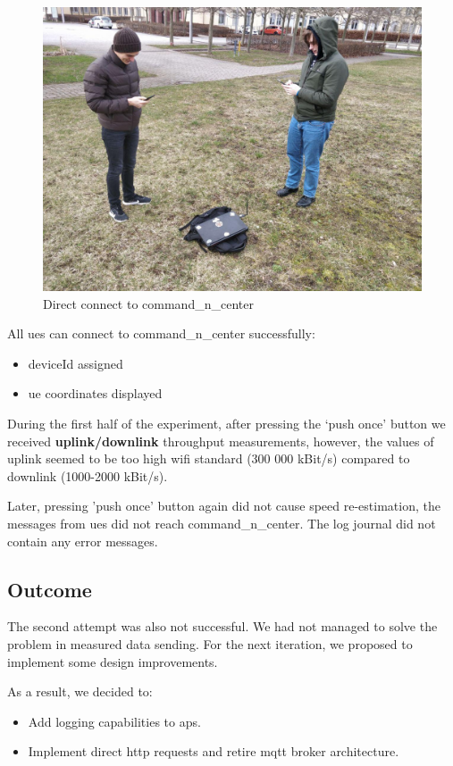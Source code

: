\begin{figure}[H]
	\centering
	\includegraphics[width=0.7\linewidth,keepaspectratio]{images/experiment_2_overview.jpg}
	\caption{Direct connect to \gls{command_n_center}}
	\label{fig:attempt-2-direct-cnc-connection}
\end{figure}

All \glspl{ue} can connect to \gls{command_n_center} successfully:

\begin{itemize}
	\tightlist
	\item
	deviceId assigned
	\item
	\gls{ue} coordinates displayed
\end{itemize}

During the first half of the experiment, after pressing the `push once' button we received \textbf{uplink/downlink} throughput measurements, however, the values of uplink seemed to be too high \gls{wifi} standard (300 000 kBit/s) compared to downlink (1000-2000 kBit/s).

Later, pressing 'push once' button again did not cause speed re-estimation, the messages from \glspl{ue} did not reach \gls{command_n_center}. The log journal did not contain any error messages. 

\subsection{Outcome}

The second attempt was also not successful. We had not managed to solve the problem in measured data sending. For the next iteration, we proposed to implement some design improvements.

As a result, we decided to:

\begin{itemize}
	\tightlist
	\item
	Add logging capabilities to \glspl{ap}.
	\item
	Implement direct \gls{http} requests and retire \gls{mqtt} broker architecture.
\end{itemize}
